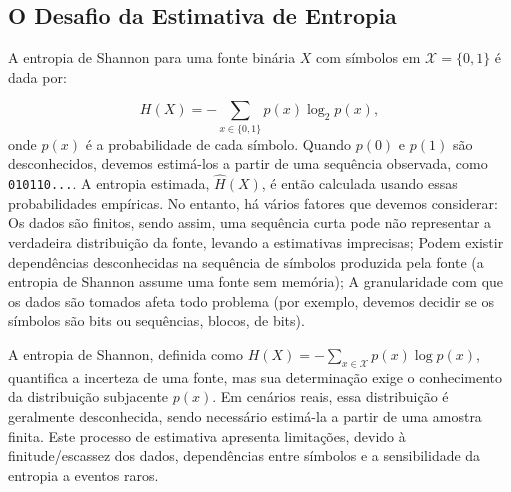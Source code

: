 \subsection{O Desafio da Estimativa de Entropia}

A entropia de Shannon para uma fonte binária $X$ com símbolos em 
$\mathcal{X} = \{0, 1\}$ é dada por:

\begin{equation}
H(X) = -\sum_{x \in \{0,1\}} p(x) \log_2 p(x),
\end{equation}
onde $p(x)$ é a probabilidade de cada símbolo. Quando $p(0)$ e $p(1)$ são
desconhecidos, devemos estimá-los a partir de uma sequência observada, como
\texttt{010110...}. A entropia estimada, $\hat{H}(X)$, é então calculada usando
essas probabilidades empíricas. No entanto, há vários fatores que devemos
considerar: Os dados são finitos, sendo assim, uma sequência curta pode não
representar a verdadeira distribuição da fonte, levando a estimativas
imprecisas; Podem existir dependências desconhecidas na sequência de símbolos
produzida pela fonte (a entropia de Shannon assume uma fonte sem memória); A
granularidade com que os dados são tomados afeta todo problema (por exemplo,
devemos decidir se os símbolos são bits ou sequências, blocos, de bits).


A entropia de Shannon, definida como $H(X) = -\sum_{x \in \mathcal{X}} p(x) \log p(x)$, 
quantifica a incerteza de uma fonte, mas sua determinação exige o conhecimento
da distribuição subjacente $p(x)$. Em cenários reais, essa distribuição é
geralmente desconhecida, sendo necessário estimá-la a partir de uma amostra
finita. Este processo de estimativa apresenta limitações, devido à
finitude/escassez dos dados, dependências entre símbolos e a sensibilidade da
entropia a eventos raros. 

